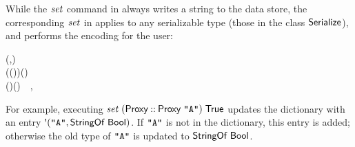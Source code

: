 While the \ensuremath{\Varid{set}} command in \Hedis{} always writes a string to the data store,
the corresponding \ensuremath{\Varid{set}} in \Redis{} applies to any serializable type (those
in the class \ensuremath{\Conid{Serialize}}), and performs the encoding for the user:
\begin{hscode}\SaveRestoreHook
{}%
%
%
\>[B]{}\<[6]%
\>[6]{}\mathbin{::}(\;,\;){}\<[E]%
\\
\>[6]{}\Rightarrow {}\;\to {}\to {}\;\;(\;\;\;(\;))\;(\;\;){}\<[E]%
\\
\>[B]{}\;\;\mathrel{=}\mathbin{\$}\;(\;)\;(\;)~~,{}\<[E]%
\ColumnHook
\end{hscode}\resethooks
For example, executing \ensuremath{\Varid{set}\;(\Conid{Proxy}\mathbin{::}\Conid{Proxy}\;\text{\tt \char34 A\char34})\;\Conid{True}} updates the dictionary
with an entry \ensuremath{\mbox{\textquotesingle}(\text{\tt \char34 A\char34},\Conid{StringOf}\;\Conid{Bool})}. If \ensuremath{\text{\tt \char34 A\char34}} is not in the dictionary,
this entry is added; otherwise the old type of \ensuremath{\text{\tt \char34 A\char34}} is updated to
\ensuremath{\Conid{StringOf}\;\Conid{Bool}}.

